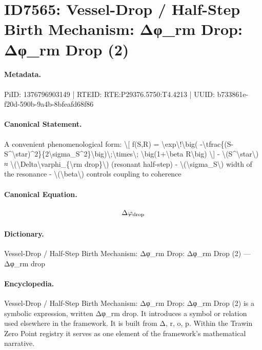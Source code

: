 \section*{ID7565: Vessel-Drop / Half-Step Birth Mechanism: Δφ\_rm Drop: Δφ\_rm Drop (2)}
\paragraph{Metadata.}
PiID: 1376796903149 | RTEID: RTE:P29376.5750:T4.4213 | UUID: b733861e-f20d-590b-9a4b-8bfeafd68f86

\paragraph{Canonical Statement.}
A convenient phenomenological form: \textbackslash{}[ f(S,R) = \textbackslash{}exp\textbackslash{}!\textbackslash{}big( -\textbackslash{}tfrac\{(S-S\textasciicircum{}\textbackslash{}star)\textasciicircum{}2\}\{2\textbackslash{}sigma\_S\textasciicircum{}2\}\textbackslash{}big)\textbackslash{};\textbackslash{}times\textbackslash{}; \textbackslash{}big(1+\textbackslash{}beta R\textbackslash{}big) \textbackslash{}] - \textbackslash{}(S\textasciicircum{}\textbackslash{}star\textbackslash{}) ≈ \textbackslash{}(\textbackslash{}Delta\textbackslash{}varphi\_\{\textbackslash{}rm drop\}\textbackslash{}) (resonant half-step) - \textbackslash{}(\textbackslash{}sigma\_S\textbackslash{}) width of the resonance - \textbackslash{}(\textbackslash{}beta\textbackslash{}) controls coupling to coherence

\paragraph{Canonical Equation.}
\[
\Delta\varphi_{\rm drop}
\]

\paragraph{Dictionary.}
Vessel-Drop / Half-Step Birth Mechanism: Δφ\_rm Drop: Δφ\_rm Drop (2) — Δφ\_rm drop

\paragraph{Encyclopedia.}
Vessel-Drop / Half-Step Birth Mechanism: Δφ\_rm Drop: Δφ\_rm Drop (2) is a symbolic expression, written Δφ\_rm drop. It introduces a symbol or relation used elsewhere in the framework. It is built from Δ, r, o, p. Within the Trawin Zero Point registry it serves as one element of the framework's mathematical narrative.
